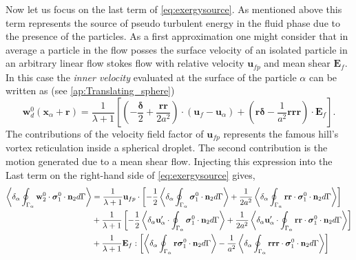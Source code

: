Now let us focus on the last term of \ref{eq:exergysource}.
As mentioned above this term represents the source of pseudo turbulent energy in the fluid phase due to the presence of the particles. 
As a first approximation one might consider that in average a particle in the flow posses the surface velocity of an isolated particle in an arbitrary linear flow stokes flow with relative velocity  $\textbf{u}_{fp}$ and mean shear $\textbf{E}_f$.
In this case the \textit{inner velocity} evaluated at the surface of the particle $\alpha$ can be written as (see \ref{ap:Translating_sphere})
\begin{equation*}
    \textbf{w}_d^0 (\textbf{x}_\alpha + \textbf{r})
    = 
    \frac{1}{\lambda +1} \left[\left(
        -\frac{\bm\delta}{2}
        + 
        \frac{\textbf{rr}}{2a^2}
    \right)\cdot (\textbf{u}_{f} - \textbf{u}_\alpha) 
    + \left(\textbf{r}\bm\delta
    -\frac{1}{a^2}\textbf{rrr}\right)\cdot \textbf{E}_f
    \right].
\end{equation*}
The contributions of the velocity field factor of $\textbf{u}_{fp}$ represents the famous hill's vortex reticulation inside a spherical droplet. 
The second contribution is the motion generated due to a mean shear flow. 
Injecting this expression into the Last term on the right-hand side of \ref{eq:exergysource} gives, 
\begin{align}
    \left<\delta_\alpha \oint_{\Gamma_\alpha} \textbf{w}_2^0 \cdot \bm{\sigma}_1^0\cdot\textbf{n}_2 d\Gamma\right>
    &=  
    \frac{1}{\lambda+1}\textbf{u}_{fp} \cdot \left[
        -\frac{1}{2}\left<\delta_\alpha \oint_{\Gamma_\alpha}  \bm{\sigma}_1^0\cdot\textbf{n}_2 d\Gamma\right>
        + \frac{1}{2a^2}
        \left<\delta_\alpha \oint_{\Gamma_\alpha} \textbf{rr}\cdot \bm{\sigma}_1^0\cdot\textbf{n}_2 d\Gamma\right>
    \right]\nonumber
    \\
    &+ \frac{1}{\lambda+1} \left[
        -\frac{1}{2}
        \left<\delta_\alpha \textbf{u}_\alpha' \cdot  \oint_{\Gamma_\alpha} \bm{\sigma}_1^0\cdot\textbf{n}_2 d\Gamma\right>
        + \frac{1}{2a^2}
        \left<\delta_\alpha \textbf{u}_\alpha' \cdot \oint_{\Gamma_\alpha} \textbf{rr}\cdot \bm{\sigma}_1^0\cdot\textbf{n}_2 d\Gamma\right>
    \right] \nonumber
    \\
    &+ \frac{1}{\lambda + 1} \textbf{E}_{f} : \left[ 
         \left<\delta_\alpha \oint_{\Gamma_\alpha} \textbf{r} \bm{\sigma}_1^0\cdot\textbf{n}_2 d\Gamma\right>
         -\frac{1}{a^2} 
         \left<\delta_\alpha \oint_{\Gamma_\alpha}  \textbf{rrr} \cdot \bm{\sigma}_1^0\cdot\textbf{n}_2 d\Gamma\right>
         \right]
    \label{eq:energy_term}
\end{align}
